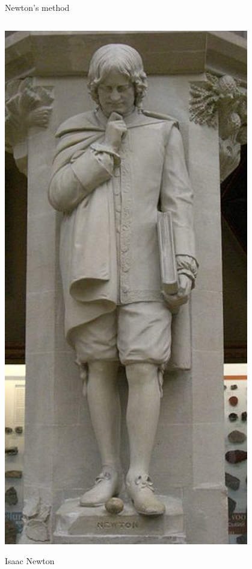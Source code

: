 \documentclass[10pt,hyperref,dvipsnames]{beamer}
\begin{document}
\begin{frame}{Newton's method}
\begin{columns}
\begin{column}{0.2\textwidth}
\hfill \includegraphics[width=0.8\textwidth]{figs/people/inewton.jpg}

\hfill {\tiny Isaac Newton}
\end{column}
\end{columns}
\end{frame}
\end{document}
